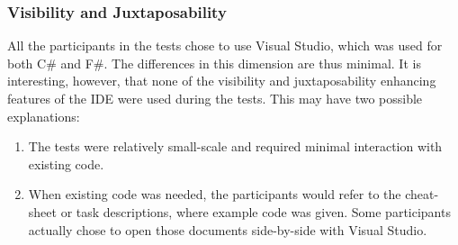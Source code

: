 \subsubsection{Visibility and Juxtaposability}
All the participants in the tests chose to use Visual Studio, which was used for both C\# and F\#. The differences in this dimension are thus minimal. It is interesting, however, that none of the visibility and juxtaposability enhancing features of the \gls{IDE} were used during the tests. This may have two possible explanations:
\begin{enumerate}
    \item The tests were relatively small-scale and required minimal interaction with existing code.
    \item When existing code was needed, the participants would refer to the cheat-sheet or task descriptions, where example code was given. Some participants actually chose to open those documents side-by-side with Visual Studio.
\end{enumerate}